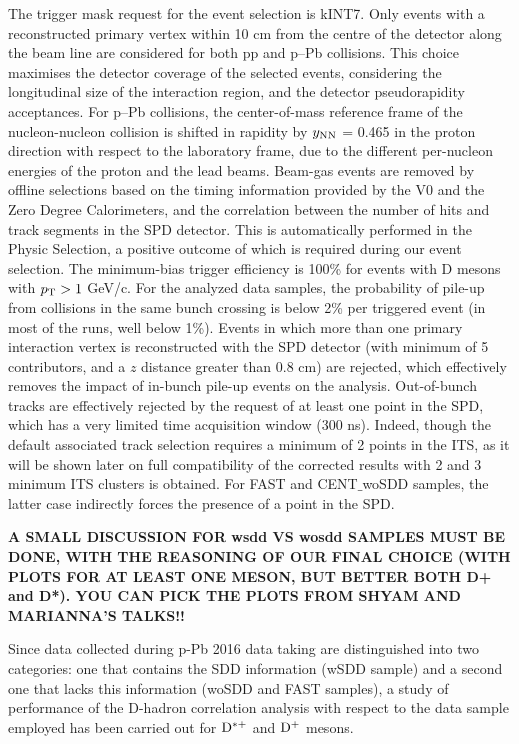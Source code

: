 The trigger mask request for the event selection is kINT7. Only events with a reconstructed primary vertex within 10 cm from the centre of the detector along the beam line are considered for both pp and p–Pb collisions. This choice maximises the detector coverage of the selected events, considering the longitudinal size of the interaction region, and
the detector pseudorapidity acceptances. For p–Pb collisions, the center-of-mass reference frame of the nucleon-nucleon collision is shifted in rapidity by $y_{\rm NN}$ = 0.465 in the proton direction with respect to the laboratory frame, due to the different per-nucleon energies of the proton and the lead beams.
Beam-gas events are removed by offline selections based on the timing information provided by the V0 and the Zero Degree Calorimeters, and the correlation between the number of hits and track segments in the SPD detector. This is automatically performed in the Physic Selection, a positive outcome of which is required during our event selection.
The minimum-bias trigger efficiency is 100\% for events with D mesons with $p_{\rm T} > 1$ GeV/c. For the analyzed data samples, the probability of
pile-up from collisions in the same bunch crossing is below 2\% per triggered event (in most of the runs, well below 1\%). Events in which more than one primary interaction vertex is reconstructed with the SPD detector (with minimum of 5 contributors, and a $z$ distance greater than 0.8 cm) are
rejected, which effectively removes the impact of in-bunch pile-up events on the analysis. Out-of-bunch tracks are effectively rejected by the request of at least one point in the SPD, which has a very limited time acquisition window (300 ns). Indeed, though the default associated track selection requires a minimum of 2 points in the ITS, as it will be shown later on full compatibility of the corrected results with 2 and 3 minimum ITS clusters is obtained. For FAST and CENT$\_$woSDD samples, the latter case indirectly forces the presence of a point in the SPD. 

{\bf A SMALL DISCUSSION FOR wsdd VS wosdd SAMPLES MUST BE DONE, WITH THE REASONING OF OUR FINAL CHOICE (WITH PLOTS FOR AT LEAST ONE MESON, BUT BETTER BOTH D+ and D*). YOU CAN PICK THE PLOTS FROM SHYAM AND MARIANNA'S TALKS!!} 

Since data collected during p-Pb 2016 data taking are distinguished into two categories: one that contains the SDD information (wSDD sample) and a second one that lacks this information (woSDD and FAST samples), a study of performance of the D-hadron correlation analysis with respect to the data sample employed has been carried out for ${\rm D^{*+}}$ and ${\rm D^+}$ mesons. 

